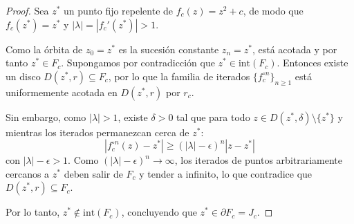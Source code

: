 \documentclass[11pt,a4paper]{article}
\theoremstyle{definition}
\theoremstyle{plain}
\theoremstyle{remark}
\begin{document}
	\begin{proof}
		Sea $z^*$ un punto fijo repelente de $f_c(z) = z^2 + c$, de modo que $f_c(z^*) = z^*$ y $|\lambda| = |f_c'(z^*)| > 1$.
		
		Como la órbita de $z_0 = z^*$ es la sucesión constante $z_n = z^*$, está acotada y por tanto $z^* \in F_c$. Supongamos por contradicción que $z^* \in \text{int}(F_c)$. Entonces existe un disco $D(z^*, r) \subseteq F_c$, por lo que la familia de iterados $\{f_c^{\circ n}\}_{n \ge 1}$ está uniformemente acotada en $D(z^*, r)$ por $r_c$.
		
		Sin embargo, como $|\lambda| > 1$, existe $\delta > 0$ tal que para todo $z \in D(z^*, \delta) \setminus \{z^*\}$ y mientras los iterados permanezcan cerca de $z^*$:
		\[ |f_c^{\circ n}(z) - z^*| \ge (|\lambda| - \epsilon)^n |z - z^*| \]
		con $|\lambda| - \epsilon > 1$. Como $(|\lambda| - \epsilon)^n \to \infty$, los iterados de puntos arbitrariamente cercanos a $z^*$ deben salir de $F_c$ y tender a infinito, lo que contradice que $D(z^*, r) \subseteq F_c$.
		
		Por lo tanto, $z^* \notin \text{int}(F_c)$, concluyendo que $z^* \in \partial F_c = J_c$.
	\end{proof}
\end{document}
